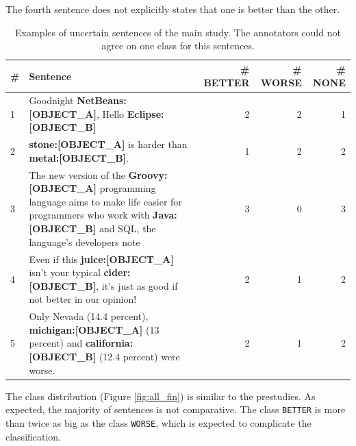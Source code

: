 The fourth sentence does not explicitly states that one is better than the other.
\begin{table}[htbp]
\centering
\caption{Examples of uncertain sentences of the main study. The annotators could not agree on one class for this sentences.}
\label{tbl:all_res}
\begin{tabularx}{\textwidth}{lXrrr}
\toprule
\# & Sentence        & \# BETTER  & \# WORSE & \# NONE            \\ \midrule
1 & Goodnight \textbf{{\color[HTML]{9A14B2}NetBeans:{[}OBJECT\_A{]}}}, Hello \textbf{{\color[HTML]{6CB219}Eclipse:{[}OBJECT\_B{]}}} & 2&2&1\\

2 & \textbf{{\color[HTML]{9A14B2}stone:{[}OBJECT\_A{]}}} is harder than \textbf{{\color[HTML]{6CB219}metal:{[}OBJECT\_B{]}}}. & 1 & 2 & 2 \\

3 & The new version of the \textbf{{\color[HTML]{9A14B2}Groovy:{[}OBJECT\_A{]}}} programming language aims to make life easier for programmers who work with \textbf{{\color[HTML]{6CB219}Java:{[}OBJECT\_B{]}}} and SQL, the language's developers note & 3 & 0 & 3 \\

4 & Even if this \textbf{{\color[HTML]{9A14B2}juice:{[}OBJECT\_A{]}}} isn't your typical \textbf{{\color[HTML]{6CB219}cider:{[}OBJECT\_B{]}}}, it's just as good if not better in our opinion! & 2 & 1 & 2 \\

5 & Only Nevada (14.4 percent), \textbf{{\color[HTML]{9A14B2}michigan:{[}OBJECT\_A{]}}}  (13 percent) and  \textbf{{\color[HTML]{6CB219}california:{[}OBJECT\_B{]}}} (12.4 percent) were worse. & 2 & 1 & 2\\
\bottomrule                              
\end{tabularx}
\end{table}


The class distribution (Figure \ref{fig:all_fin}) is similar to the prestudies. As expected, the majority of sentences is not comparative. 
The class \texttt{BETTER} is more than twice as big as the class \texttt{WORSE}, which is expected to complicate the classification.


